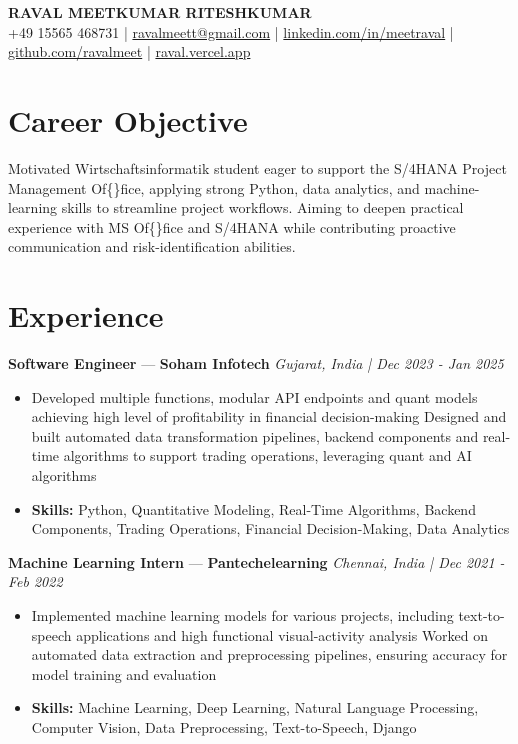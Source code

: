 \documentclass[a4paper,10pt]{article}
\begin{document}
\begin{center}
  {\Large\bfseries RAVAL MEETKUMAR RITESHKUMAR}\\[2pt]
  {\small +49 15565 468731 \;|\; \href{mailto:ravalmeett@gmail.com}{ravalmeett@gmail.com} \;|\; \href{https://www.linkedin.com/in/meetraval/}{linkedin.com/in/meetraval} \;|\; \href{https://github.com/ravalmeet}{github.com/ravalmeet} \;|\; \href{https://raval.vercel.app/}{raval.vercel.app}}
\end{center}
\vspace{-3pt}

\section*{Career Objective}
Motivated Wirtschaftsinformatik student eager to support the S/4HANA Project Management Of\{\}fice, applying strong Python, data analytics, and machine-learning skills to streamline project workflows. Aiming to deepen practical experience with MS Of\{\}fice and S/4HANA while contributing proactive communication and risk-identification abilities.\par

\section*{Experience}
\textbf{Software Engineer} — \textbf{Soham Infotech} \hfill \textit{Gujarat, India \;|\; Dec 2023 - Jan 2025}\par
\vspace{1pt}
\begin{itemize}
  \item Developed multiple functions, modular API endpoints and quant models achieving high level of profitability in financial decision-making Designed and built automated data transformation pipelines, backend components and real-time algorithms to support trading operations, leveraging quant and AI algorithms
  \item \textbf{Skills:} Python, Quantitative Modeling, Real-Time Algorithms, Backend Components, Trading Operations, Financial Decision-Making, Data Analytics
\end{itemize}
\vspace{3pt}
\textbf{Machine Learning Intern} — \textbf{Pantechelearning} \hfill \textit{Chennai, India \;|\; Dec 2021 - Feb 2022}\par
\vspace{1pt}
\begin{itemize}
  \item Implemented machine learning models for various projects, including text-to-speech applications and high functional visual-activity analysis Worked on automated data extraction and preprocessing pipelines, ensuring accuracy for model training and evaluation
  \item \textbf{Skills:} Machine Learning, Deep Learning, Natural Language Processing, Computer Vision, Data Preprocessing, Text-to-Speech, Django
\end{itemize}
\end{document}
